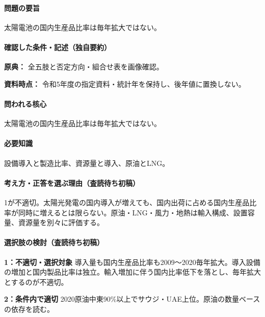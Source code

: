 \paragraph{問題の要旨} 太陽電池の国内生産品比率は毎年拡大ではない。

\paragraph{確認した条件・記述（独自要約）}\mbox{}\par

\noindent\textbf{原典：} 全五肢と否定方向・組合せ表を画像確認。\par

\noindent\textbf{資料時点：} 令和5年度の指定資料・統計年を保持し、後年値に置換しない。\par

\paragraph{問われる核心} 太陽電池の国内生産品比率は毎年拡大ではない。

\paragraph{必要知識} 設備導入と製造比率、資源量と導入、原油とLNG。

\paragraph{考え方・正答を選ぶ理由（査読待ち初稿）} 1が不適切。太陽光発電の国内導入が増えても、国内出荷に占める国内生産品比率が同時に増えるとは限らない。原油・LNG・風力・地熱は輸入構成、設置容量、資源量を別々に評価する。

\paragraph{選択肢の検討（査読待ち初稿）}\mbox{}\par

\noindent\textbf{1：不適切・選択対象} 導入量も国内生産品比率も2009〜2020毎年拡大。導入設備の増加と国内製品比率は独立。輸入増加に伴う国内比率低下を落とし、毎年拡大とするのが不適切。\par

\noindent\textbf{2：条件内で適切} 2020原油中東90\%以上でサウジ・UAE上位。原油の数量ベースの依存を読む。\par


